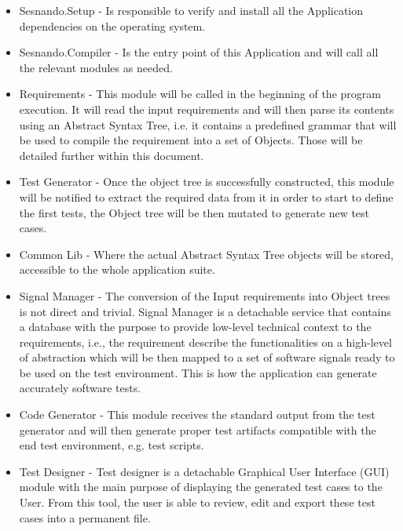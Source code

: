 \begin{itemize}

\item Sesnando.Setup - Is responsible to verify and install all the Application dependencies on the operating system.

\item Sesnando.Compiler - Is the entry point of this Application and will call all the relevant modules as needed.

\item Requirements - This module will be called in the beginning of the program execution. It will read the input requirements and will then parse its contents using an Abstract Syntax Tree, i.e. it contains a predefined grammar that will be used to compile the requirement into a set of Objects. Those will be detailed further within this document.

\item Test Generator - Once the object tree is successfully constructed, this module will be notified to extract the required data from it in order to start to define the first tests, the Object tree will be then mutated to generate new test cases.

\item Common Lib - Where the actual Abstract Syntax Tree objects will be stored, accessible to the whole application suite.

\item Signal Manager - The conversion of the Input requirements into Object trees is not direct and trivial. Signal Manager is a detachable service that contains a database with the purpose to provide low-level technical context to the requirements, i.e., the requirement describe the functionalities on a high-level of abstraction which will be then mapped to a set of software signals ready to be used on the test environment. This is how the application can generate accurately software tests.

\item Code Generator - This module receives the standard output from the test generator and will then generate proper test artifacts compatible with the end test environment, e.g. test scripts.

\item Test Designer - Test designer is a detachable Graphical User Interface (GUI) module with the main purpose of displaying the generated test cases to the User. From this tool, the user is able to review, edit and export these test cases into a permanent file.
\end{itemize}
